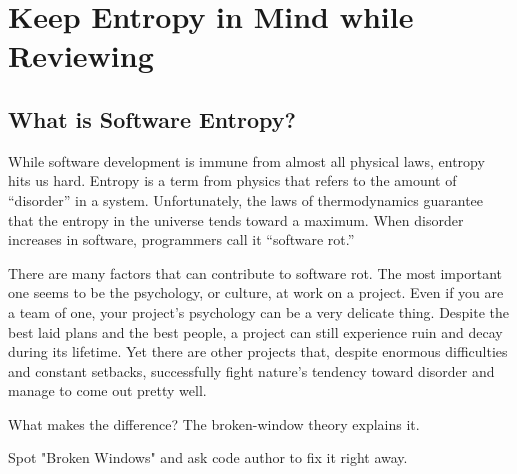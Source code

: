 
\chapter{Keep Entropy in Mind while Reviewing}

\section{What is Software Entropy?}

While software development is immune from almost all physical laws, entropy hits us hard. Entropy is a term from physics that refers to the amount of “disorder” in a system. Unfortunately, the laws of thermodynamics guarantee that the entropy in the universe tends toward a maximum. When disorder increases in software, programmers call it “software rot.”

There are many factors that can contribute to software rot. The most important one seems to be the psychology, or culture, at work on a project. Even if you are a team of one, your project’s psychology can be a very delicate thing. Despite the best laid plans and the best people, a project can still experience ruin and decay during its lifetime. Yet there are other projects that, despite enormous difficulties and constant setbacks, successfully fight nature’s tendency toward disorder and manage to come out pretty well.

What makes the difference? The broken-window theory explains it.

\begin{marker}
Spot "Broken Windows" and ask code author to fix it right away.
\end{marker}
